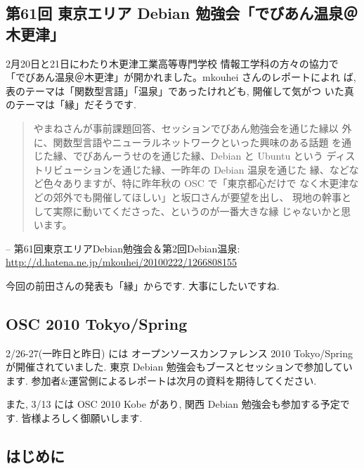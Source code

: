 \documentclass[mingoth,a4paper]{jsarticle}
\begin{document}
\subsection{第61回 東京エリア Debian 勉強会「でびあん温泉＠木更津」}

2月20日と21日にわたり木更津工業高等専門学校 情報工学科の方々の協力で
「でびあん温泉＠木更津」が開かれました。mkouhei さんのレポートによれ
ば, 表のテーマは「関数型言語」「温泉」であったけれども, 開催して気がつ
いた真のテーマは「縁」だそうです.
\begin{screen}
    \begin{quote}
        やまねさんが事前課題回答、セッションでびあん勉強会を通じた縁以
        外に、関数型言語やニューラルネットワークといった興味のある話題
        を通じた縁、でびあんーうせのを通じた縁、Debian と Ubuntu という
        ディストリビューションを通じた縁、一昨年の Debian 温泉を通じた
        縁、などなど色々ありますが、特に昨年秋の OSC で「東京都心だけで
        なく木更津などの郊外でも開催してほしい」と坂口さんが要望を出し、
        現地の幹事として実際に動いてくださった、というのが一番大きな縁
        じゃないかと思います。
    \end{quote}
    \begin{flushright}
        -- 第61回東京エリアDebian勉強会＆第2回Debian温泉:
        \url{http://d.hatena.ne.jp/mkouhei/20100222/1266808155}
    \end{flushright}
\end{screen}
今回の前田さんの発表も「縁」からです. 大事にしたいですね.


\subsection{OSC 2010 Tokyo/Spring}

2/26-27(一昨日と昨日) には オープンソースカンファレンス 2010
Tokyo/Spring が開催されていました. 
東京 Debian 勉強会もブースとセッションで参加しています. 
参加者\&運営側によるレポートは次月の資料を期待してください.

また, 3/13 には OSC 2010 Kobe があり, 
関西 Debian 勉強会も参加する予定です. 
皆様よろしく御願いします.



\subsection{はじめに}
\end{document}
